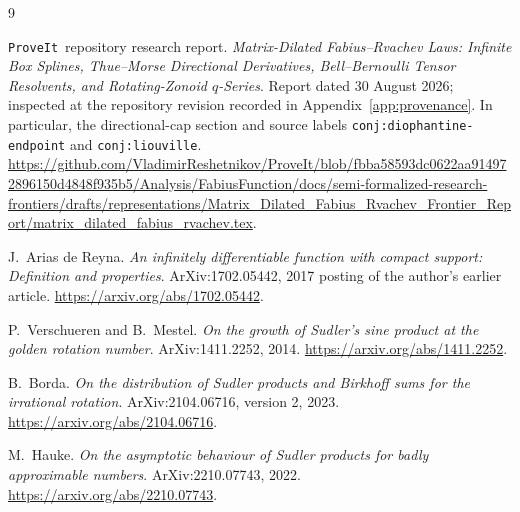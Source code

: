\documentclass[11pt,a4paper]{article}
\theoremstyle{definition}
\theoremstyle{remark}\newtheorem{remark}[theorem]{Remark}
\newcommand{\repo}{\texttt{ProveIt}}
\begin{document}
\clearpage
{}
{}
\begin{thebibliography}{9}

\repo\ repository research report.
\emph{Matrix-Dilated Fabius--Rvachev Laws: Infinite Box Splines,
Thue--Morse Directional Derivatives, Bell--Bernoulli Tensor Resolvents,
and Rotating-Zonoid $q$-Series}.
Report dated 30 August 2026; inspected at the repository revision recorded in
Appendix~\ref{app:provenance}.  In particular, the directional-cap section
and source labels \texttt{conj:diophantine-endpoint} and
\texttt{conj:liouville}.
\url{https://github.com/VladimirReshetnikov/ProveIt/blob/fbba58593dc0622aa914972896150d4848f935b5/Analysis/FabiusFunction/docs/semi-formalized-research-frontiers/drafts/representations/Matrix_Dilated_Fabius_Rvachev_Frontier_Report/matrix_dilated_fabius_rvachev.tex}.

J.~Arias de Reyna.
\emph{An infinitely differentiable function with compact support:
Definition and properties}.
ArXiv:1702.05442, 2017 posting of the author's earlier article.
\url{https://arxiv.org/abs/1702.05442}.

P.~Verschueren and B.~Mestel.
\emph{On the growth of Sudler's sine product at the golden rotation number}.
ArXiv:1411.2252, 2014.
\url{https://arxiv.org/abs/1411.2252}.

B.~Borda.
\emph{On the distribution of Sudler products and Birkhoff sums for the
irrational rotation}.
ArXiv:2104.06716, version 2, 2023.
\url{https://arxiv.org/abs/2104.06716}.

M.~Hauke.
\emph{On the asymptotic behaviour of Sudler products for badly
approximable numbers}.
ArXiv:2210.07743, 2022.
\url{https://arxiv.org/abs/2210.07743}.

\end{thebibliography}
\end{document}
